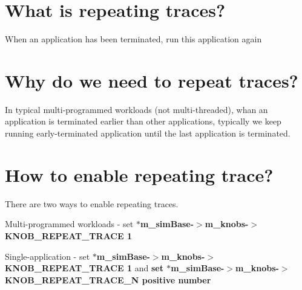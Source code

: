 \hypertarget{repeat_repeat_1}{}\section{What is repeating traces?}\label{repeat_repeat_1}
When an application has been terminated, run this application again\hypertarget{repeat_repeat_2}{}\section{Why do we need to repeat traces?}\label{repeat_repeat_2}
In typical multi-\/programmed workloads (not multi-\/threaded), whan an application is terminated earlier than other applications, typically we keep running early-\/terminated application until the last application is terminated.\hypertarget{repeat_repeat_3}{}\section{How to enable repeating trace?}\label{repeat_repeat_3}
There are two ways to enable repeating traces. \begin{DoxyItemize}
\item Multi-\/programmed workloads -\/ set {\bfseries $\ast$m\_\-simBase-\/$>$m\_\-knobs-\/$>$KNOB\_\-REPEAT\_\-TRACE 1} \item Single-\/application -\/ set {\bfseries $\ast$m\_\-simBase-\/$>$m\_\-knobs-\/$>$KNOB\_\-REPEAT\_\-TRACE 1} and {\bfseries set $\ast$m\_\-simBase-\/$>$m\_\-knobs-\/$>$KNOB\_\-REPEAT\_\-TRACE\_\-N positive number} \end{DoxyItemize}
